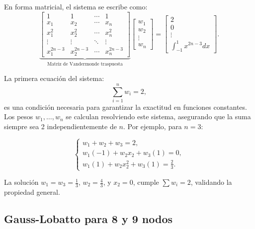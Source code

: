 \documentclass[a4paper]{article}
\begin{document}
\noindent En forma matricial, el sistema se escribe como:
\[
\underbrace{
\begin{bmatrix}
1 & 1 & \cdots & 1 \\
x_1 & x_2 & \cdots & x_n \\
x_1^2 & x_2^2 & \cdots & x_n^2 \\
\vdots & \vdots & \ddots & \vdots \\
x_1^{2n-3} & x_2^{2n-3} & \cdots & x_n^{2n-3}
\end{bmatrix}
}_{\text{Matriz de Vandermonde traspuesta}}
\begin{bmatrix}
w_1 \\
w_2 \\
\vdots \\
w_n
\end{bmatrix}
=
\begin{bmatrix}
2 \\
0 \\
\vdots \\
\int_{-1}^1 x^{2n-3} dx
\end{bmatrix}.
\]

\noindent La primera ecuación del sistema:
\[
\sum_{i=1}^n w_i = 2,
\]
es una condición necesaria para garantizar la exactitud en funciones constantes. Los pesos \( w_1, \ldots, w_n \) se calculan resolviendo este sistema, asegurando que la suma siempre sea 2 independientemente de \( n \). Por ejemplo, para \( n=3 \):

\[
\begin{cases}
w_1 + w_2 + w_3 = 2, \\
w_1(-1) + w_2 x_2 + w_3(1) = 0, \\
w_1(1) + w_2 x_2^2 + w_3(1) = \frac{2}{3}.
\end{cases}
\]

\noindent La solución \( w_1 = w_3 = \frac{1}{3} \), \( w_2 = \frac{4}{3} \), y \( x_2 = 0 \), cumple \( \sum w_i = 2 \), validando la propiedad general.


\subsection{Gauss-Lobatto para 8 y 9 nodos}
\end{document}
